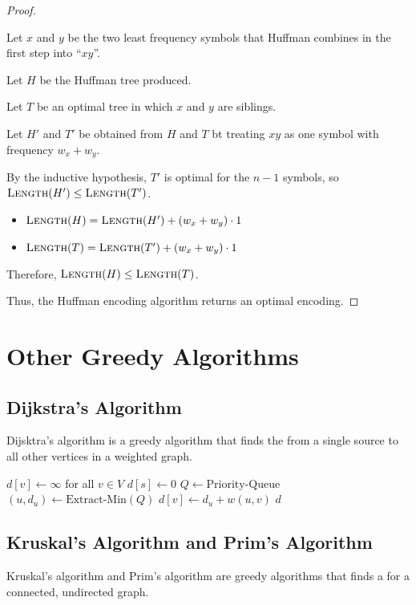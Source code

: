 \begin{proof}
\begin{itemize}
        Let $x$ and $y$ be the two least frequency symbols that Huffman combines in the first step into ``$xy$''.

        Let $H$ be the Huffman tree produced. 

        Let $T$ be an optimal tree in which $x$ and $y$ are siblings.

        Let $H'$ and $T'$ be obtained from $H$ and $T$ bt treating $xy$ as one symbol with frequency $w_x + w_y$.

        By the inductive hypothesis, $T'$ is optimal for the $n - 1$ symbols, so $\textsc{Length}(H') \le \textsc{Length}(T')$.

        \begin{itemize}
            \item $\textsc{Length}(H) = \textsc{Length}(H') + (w_x + w_y) \cdot 1$
            \item $\textsc{Length}(T) = \textsc{Length}(T') + (w_x + w_y) \cdot 1$
        \end{itemize}

        Therefore, $\textsc{Length}(H) \le \textsc{Length}(T)$.
    \end{itemize}

    Thus, the Huffman encoding algorithm returns an optimal encoding.
\end{proof}

\section{Other Greedy Algorithms}

\subsection{Dijkstra's Algorithm}\label{subsec:dijkstras-algorithm}

Dijsktra's algorithm is a greedy algorithm that finds the  from a single source to all other vertices in a weighted graph. 

\begin{algorithm}[ht!]
    \begin{algorithmic}[1]
            \State $d[v] \gets \infty$ for all $v \in V$
            \State $d[s] \gets 0$
            \State $Q \gets \text{Priority-Queue}$
            \State {}
                \State $(u, d_u) \gets \text{Extract-Min}(Q)$
                        \State $d[v] \gets d_u + w(u, v)$
                        \State {}
                    \EndIf
                \EndFor
            \EndWhile
            \State \Return $d$
        \EndFunction
    \end{algorithmic}
\end{algorithm}

\subsection{Kruskal's Algorithm and Prim's Algorithm}

Kruskal's algorithm and Prim's algorithm are greedy algorithms that finds a  for a connected, undirected graph. 


